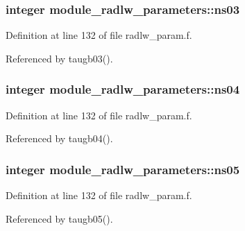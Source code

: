 \subsubsection[{\texorpdfstring{ns03}{ns03}}]{\setlength{\rightskip}{0pt plus 5cm}integer module\+\_\+radlw\+\_\+parameters\+::ns03}\hypertarget{namespacemodule__radlw__parameters_a987d257f8e2f0743e92055be94424401}{}\label{namespacemodule__radlw__parameters_a987d257f8e2f0743e92055be94424401}


Definition at line 132 of file radlw\+\_\+param.\+f.



Referenced by taugb03().

\subsubsection[{\texorpdfstring{ns04}{ns04}}]{\setlength{\rightskip}{0pt plus 5cm}integer module\+\_\+radlw\+\_\+parameters\+::ns04}\hypertarget{namespacemodule__radlw__parameters_a57f85389c924ba16fad61578170eadcc}{}\label{namespacemodule__radlw__parameters_a57f85389c924ba16fad61578170eadcc}


Definition at line 132 of file radlw\+\_\+param.\+f.



Referenced by taugb04().

\subsubsection[{\texorpdfstring{ns05}{ns05}}]{\setlength{\rightskip}{0pt plus 5cm}integer module\+\_\+radlw\+\_\+parameters\+::ns05}\hypertarget{namespacemodule__radlw__parameters_a6bb5413129239f08596d4e7233c666a5}{}\label{namespacemodule__radlw__parameters_a6bb5413129239f08596d4e7233c666a5}


Definition at line 132 of file radlw\+\_\+param.\+f.



Referenced by taugb05().

